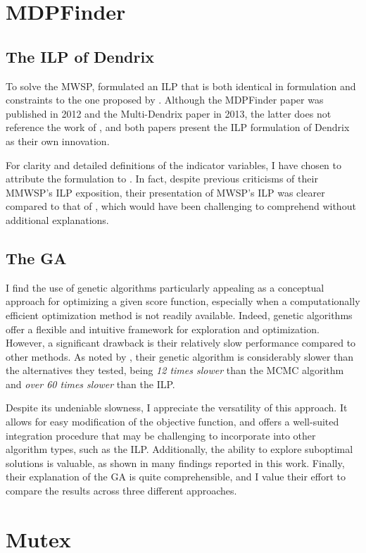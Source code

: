 \section{MDPFinder}

\subsection{The ILP of Dendrix}

To solve the MWSP, \textcite{mdpfinder} formulated an ILP that is both identical in formulation and constraints to the one proposed by \textcite{multi-dendrix}. Although the MDPFinder paper was published in 2012 and the Multi-Dendrix paper in 2013, the latter does not reference the work of \textcite{mdpfinder}, and both papers present the ILP formulation of Dendrix as their own innovation.

For clarity and detailed definitions of the indicator variables, I have chosen to attribute the formulation to \textcite{multi-dendrix}. In fact, despite previous criticisms of their MMWSP's ILP exposition, their presentation of MWSP's ILP was clearer compared to that of \textcite{mdpfinder}, which would have been challenging to comprehend without additional explanations.

\subsection{The GA}

I find the use of genetic algorithms particularly appealing as a conceptual approach for optimizing a given score function, especially when a computationally efficient optimization method is not readily available. Indeed, genetic algorithms offer a flexible and intuitive framework for exploration and optimization. However, a significant drawback is their relatively slow performance compared to other methods. As noted by \textcite{mdpfinder}, their genetic algorithm is considerably slower than the alternatives they tested, being \textit{12 times slower} than the MCMC algorithm and \textit{over 60 times slower} than the ILP.

Despite its undeniable slowness, I appreciate the versatility of this approach. It allows for easy modification of the objective function, and offers a well-suited integration procedure that may be challenging to incorporate into other algorithm types, such as the ILP. Additionally, the ability to explore suboptimal solutions is valuable, as shown in many findings reported in this work. Finally, their explanation of the GA is quite comprehensible, and I value their effort to compare the results across three different approaches.

\section{Mutex}


\cleardoublepage
